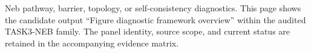 Neb pathway, barrier, topology, or self-consistency diagnostics. This page shows the candidate output ``Figure diagnostic framework overview'' within the audited TASK3-NEB family. The panel identity, source scope, and current status are retained in the accompanying evidence matrix.
